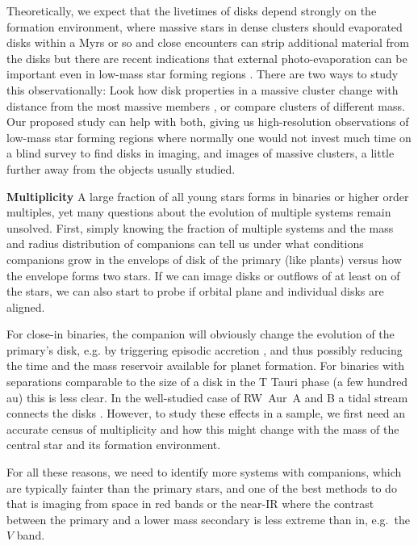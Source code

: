 \documentclass[12pt]{article}
\begin{document}
Theoretically, we expect that the livetimes of disks depend strongly on the formation environment, where massive stars in dense clusters should evaporated disks within a Myrs or so and close encounters can strip additional material from the disks \citep[e.g.][]{2004ApJ...611..360A,2019MNRAS.485.1489W,2019arXiv190211094N}but there are recent indications that external photo-evaporation can be important even in low-mass star forming regions \citep{2017MNRAS.468L.108H}.
There are two ways to study this observationally: Look how disk properties in a massive cluster change with distance from the most massive members \citep{2018ApJ...860...77E}, or compare clusters of different mass. Our proposed study can help with both, giving us high-resolution observations of low-mass star forming regions where normally one would not invest much time on a blind survey to find disks in imaging, and images of massive clusters, a little further away from the objects usually studied.




\textbf{Multiplicity}
A large fraction of all young stars forms in binaries or higher order multiples, yet many questions about the evolution of multiple systems remain unsolved. First, simply knowing the fraction of multiple systems and the mass and radius distribution of companions can tell us under what conditions companions grow in the envelops of disk of the primary (like plants) versus how the envelope forms two stars. If we can image disks or outflows of at least on of the stars, we can also start to probe if orbital plane and individual disks are aligned.

For close-in binaries, the companion will obviously change the evolution of the primary's disk, e.g. by triggering episodic accretion \citep{2013ApJ...766...62G }, and thus possibly reducing the time and the mass reservoir available for planet formation. For binaries with separations comparable to the size of a disk in the T Tauri phase (a few hundred au) this is less clear. In the well-studied case of RW~Aur~A and B a tidal stream connects the disks \citep{2006A&A...452..897C}. However, to study these effects in a sample, we first need an accurate census of multiplicity and how this might change with the mass of the central star and its formation environment.

For all these reasons, we need to identify more systems with companions, which are typically fainter than the primary stars, and one of the best methods to do that is imaging from space in red bands or the near-IR where the contrast between the primary and a lower mass secondary is less extreme than in, e.g.\ the $V$ band. 
\end{document}
